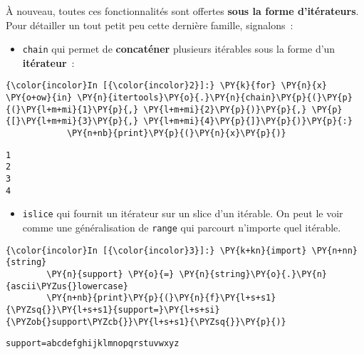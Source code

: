 À nouveau, toutes ces fonctionnalités sont offertes \textbf{sous la
forme d'itérateurs}.\\

    Pour détailler un tout petit peu cette dernière famille, signalons~:

    \begin{itemize}
\tightlist
\item
  \texttt{chain} qui permet de \textbf{concaténer} plusieurs itérables
  sous la forme d'un \textbf{itérateur}~:
\end{itemize}

    \begin{Verbatim}[commandchars=\\\{\}]
{\color{incolor}In [{\color{incolor}2}]:} \PY{k}{for} \PY{n}{x} \PY{o+ow}{in} \PY{n}{itertools}\PY{o}{.}\PY{n}{chain}\PY{p}{(}\PY{p}{(}\PY{l+m+mi}{1}\PY{p}{,} \PY{l+m+mi}{2}\PY{p}{)}\PY{p}{,} \PY{p}{[}\PY{l+m+mi}{3}\PY{p}{,} \PY{l+m+mi}{4}\PY{p}{]}\PY{p}{)}\PY{p}{:}
            \PY{n+nb}{print}\PY{p}{(}\PY{n}{x}\PY{p}{)}
\end{Verbatim}


    \begin{Verbatim}[commandchars=\\\{\}]
1
2
3
4

    \end{Verbatim}

    \begin{itemize}
\tightlist
\item
  \texttt{islice} qui fournit un itérateur sur un slice d'un itérable.
  On peut le voir comme une généralisation de \texttt{range} qui
  parcourt n'importe quel itérable.
\end{itemize}

    \begin{Verbatim}[commandchars=\\\{\}]
{\color{incolor}In [{\color{incolor}3}]:} \PY{k+kn}{import} \PY{n+nn}{string}
        \PY{n}{support} \PY{o}{=} \PY{n}{string}\PY{o}{.}\PY{n}{ascii\PYZus{}lowercase}
        \PY{n+nb}{print}\PY{p}{(}\PY{n}{f}\PY{l+s+s1}{\PYZsq{}}\PY{l+s+s1}{support=}\PY{l+s+si}{\PYZob{}support\PYZcb{}}\PY{l+s+s1}{\PYZsq{}}\PY{p}{)}
\end{Verbatim}


    \begin{Verbatim}[commandchars=\\\{\}]
support=abcdefghijklmnopqrstuvwxyz

    \end{Verbatim}

